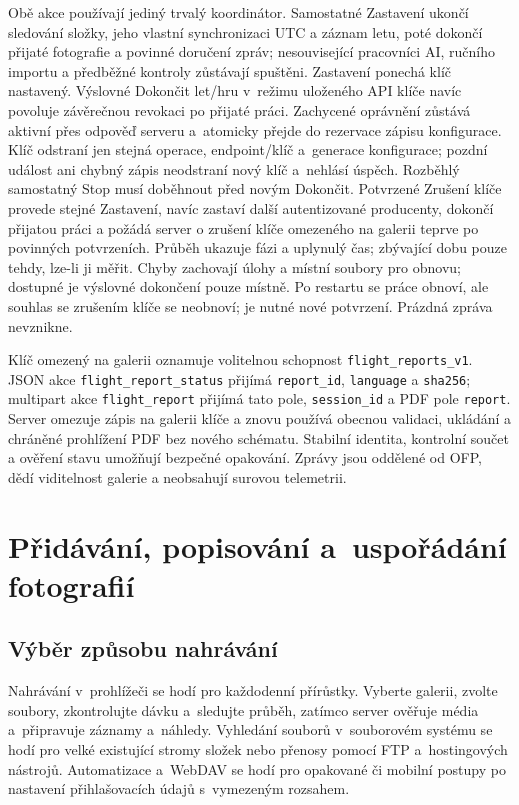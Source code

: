 \documentclass[11pt,a4paper]{article}
\begin{document}
Obě akce používají jediný trvalý koordinátor. Samostatné Zastavení ukončí
sledování složky, jeho vlastní synchronizaci UTC a záznam letu, poté dokončí
přijaté fotografie a povinné doručení zpráv; nesouvisející pracovníci AI,
ručního importu a předběžné kontroly zůstávají spuštěni. Zastavení ponechá klíč
nastavený. Výslovné Dokončit let/hru v~režimu uloženého API klíče navíc
povoluje závěrečnou revokaci po přijaté práci. Zachycené oprávnění zůstává
aktivní přes odpověď serveru a~atomicky přejde do rezervace zápisu konfigurace.
Klíč odstraní jen stejná operace, endpoint/klíč a~generace konfigurace;
pozdní událost ani chybný zápis neodstraní nový klíč a~nehlásí úspěch.
Rozběhlý samostatný Stop musí doběhnout před novým Dokončit.
Potvrzené Zrušení klíče provede stejné Zastavení, navíc zastaví další
autentizované producenty, dokončí přijatou práci a požádá server o zrušení klíče
omezeného na galerii teprve po povinných potvrzeních. Průběh ukazuje fázi a
uplynulý čas; zbývající dobu pouze tehdy, lze-li ji měřit. Chyby zachovají úlohy
a místní soubory pro obnovu; dostupné je výslovné dokončení pouze místně. Po
restartu se práce obnoví, ale souhlas se zrušením klíče se neobnoví; je nutné
nové potvrzení. Prázdná zpráva nevznikne.

Klíč omezený na galerii oznamuje volitelnou schopnost
\texttt{flight\_reports\_v1}. JSON akce
\texttt{flight\_report\_status} přijímá \texttt{report\_id},
\texttt{language} a \texttt{sha256}; multipart akce
\texttt{flight\_report} přijímá tato pole, \texttt{session\_id} a PDF pole
\texttt{report}. Server omezuje zápis na galerii klíče a znovu používá obecnou
validaci, ukládání a chráněné prohlížení PDF bez nového schématu. Stabilní
identita, kontrolní součet a ověření stavu umožňují bezpečné opakování.
Zprávy jsou oddělené od OFP, dědí viditelnost galerie a neobsahují surovou
telemetrii.

\section{Přidávání, popisování a~uspořádání fotografií}
\label{sec:photo-workflow}

\subsection{Výběr způsobu nahrávání}

Nahrávání v~prohlížeči se hodí pro každodenní přírůstky. Vyberte galerii, zvolte
soubory, zkontrolujte dávku a~sledujte průběh, zatímco server ověřuje média
a~připravuje záznamy a~náhledy. Vyhledání souborů v~souborovém systému se hodí
pro velké existující stromy složek nebo přenosy pomocí FTP a~hostingových
nástrojů. Automatizace a~WebDAV se hodí pro opakované či mobilní postupy po
nastavení přihlašovacích údajů s~vymezeným rozsahem.
\end{document}
